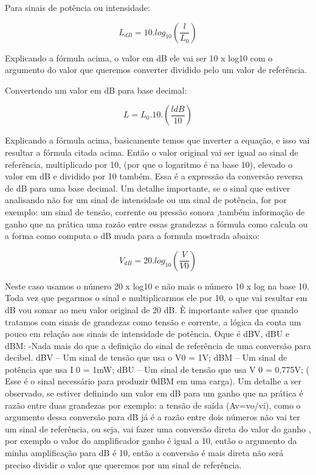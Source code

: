 \documentclass{article}
\begin{document}
    
    Para sinais de potência ou intensidade:
    
   \begin {equation}
   L_{dB} = 10.log_{10}(\frac{l}{ L_{0}})
   \end{equation}
    \newline
    
    Explicando a fórmula acima, o valor em dB ele vai ser 10 x log10 com o argumento do valor que queremos converter dividido pelo um valor de referência.
    \newline
    
    Convertendo um valor em dB para base decimal:
    \newline
    
     \begin {equation}
      L=L_{0}.10.(\frac{ldB}{ {10}})
      \end{equation}
      \newline
      
      Explicando a fórmula acima, basicamente temos que  inverter a equação, e isso vai resultar a fórmula citada acima.
Então o valor original vai ser igual ao sinal de referência, multiplicado por 10, (por que o logaritmo é na base 10), elevado o valor em dB e dividido por 10 também. Essa é a expressão da conversão reversa  de dB para uma base decimal.
Um detalhe importante, se o sinal que estiver analisando não  for um sinal de intensidade ou um sinal de potência, for por exemplo: um sinal de tensão, corrente ou  pressão sonora ,também informação de ganho que na prática uma razão entre essas grandezas a fórmula como calcula ou a forma como computa o dB muda para a formula  mostrada abaixo:
\newline

\begin {equation}
     V_{dB}=20.log_{10}(\frac{V}{ {V0}})
      \end{equation}
\newline   

Neste caso usamos o número 20 x log10 e não mais o número 10 x log na base 10. Toda vez que pegarmos o sinal e multiplicarmos  ele por 10, o que vai resultar em dB vou somar ao meu valor original de 20 dB.
È importante saber que quando tratamos com sinais de grandezas como tensão e corrente, a lógica da conta um pouco em relação aos sinais de intensidade de potência. 
Oque é dBV, dBU e dBM:
-Nada mais do que a definição do sinal de referência de uma conversão para decibel.
dBV – Um sinal de tensão que usa o V0 = 1V;
dBM – Um sinal de potência que usa I 0 = 1mW;
dBU – Um sinal de tensão que usa V 0 = 0,775V; ( Esse é o sinal necessário para produzir 0dBM  em uma carga).
Um detalhe a ser observado, se estiver definindo um valor em dB para um ganho que na prática é razão entre duas grandezas por exemplo: a tensão de saída (Av=vo/vi), como o argumento dessa conversão para dB já é a razão entre dois números não vai ter um sinal de referência, ou seja, vai fazer uma conversão direta do valor do ganho , por exemplo o valor do amplificador ganho é igual a 10, então o argumento da minha amplificação para dB é 10, então a conversão é mais direta não será preciso dividir o valor que queremos por um sinal de referência.
\newpage
\end{document}
